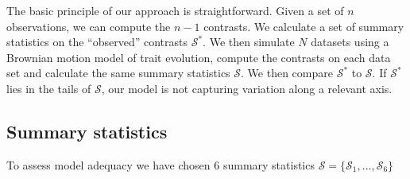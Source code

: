 \documentclass[12pt]{article}
\begin{document}
The basic principle of our approach is straightforward. Given a set of $n$ observations, we can compute the $n-1$ contrasts. We calculate a set of summary statistics on the ``observed'' contrasts $\mathcal{S}^*$. We then simulate $N$ datasets using a Brownian motion model of trait evolution, compute the contrasts on each data set and calculate the same summary statistics $\mathcal{S}$. We then compare $\mathcal{S}^*$ to $\mathcal{S}$. If $\mathcal{S}^*$ lies in the tails of $\mathcal{S}$, our model is not capturing variation along a relevant axis.

\subsection*{Summary statistics}

To assess model adequacy we have chosen 6 summary statistics $\mathcal{S} = \lbrace \mathcal{S}_1, \ldots, \mathcal{S}_6 \rbrace$
\end{document}

